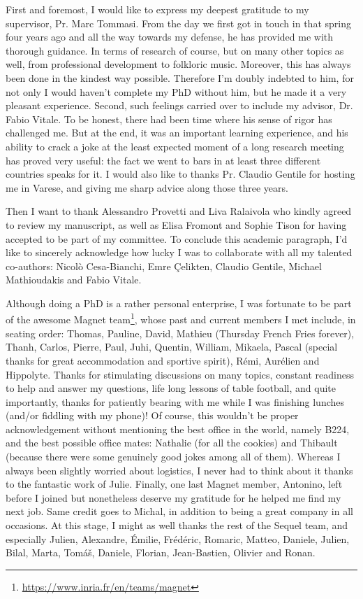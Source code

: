 First and foremost, I would like to express my deepest gratitude to my
supervisor, Pr. Marc Tommasi. From the day we first got in touch in that spring
four years ago and all the way towards my defense, he has provided me with
thorough guidance. In terms of research of course, but on many other topics as
well, from professional development to folkloric music. Moreover, this has
always been done in the kindest way possible. Therefore I'm doubly indebted to
him, for not only I would haven't complete my PhD without him, but he made it a
very pleasant experience. Second, such feelings carried over to include my
advisor, Dr. Fabio Vitale. To be honest, there had been time where his sense of
rigor has challenged me. But at the end, it was an important learning
experience, and his ability to crack a joke at the least expected moment of a
long research meeting has proved very useful: the fact we went to bars in at
least three different countries speaks for it. I would also like to thanks Pr.
Claudio Gentile for hosting me in Varese, and giving me sharp advice along
those three years.

Then I want to thank Alessandro Provetti and Liva Ralaivola who kindly agreed
to review my manuscript, as well as Elisa Fromont and Sophie Tison for having
accepted to be part of my committee.
%
To conclude this academic paragraph, I'd like to sincerely acknowledge how
lucky I was to collaborate with all my talented co-authors: Nicolò
Cesa-Bianchi, Emre Çelikten, Claudio Gentile, Michael Mathioudakis and Fabio
Vitale.

Although doing a PhD is a rather personal enterprise, I was fortunate to be
part of the awesome Magnet
team\footnote{\url{https://www.inria.fr/en/teams/magnet}}, whose past and
current members I met include, in seating order: Thomas, Pauline, David,
Mathieu (Thursday French Fries forever), Thanh, Carlos, Pierre, Paul, Juhi,
Quentin, William, Mikaela, Pascal (special thanks for great accommodation and
sportive spirit), Rémi, Aurélien and Hippolyte. Thanks for stimulating
discussions on many topics, constant readiness to help and answer my questions,
life long lessons of table football, and quite importantly, thanks for
patiently bearing with me while I was finishing lunches (and/or fiddling with
my phone)! Of course, this wouldn't be proper acknowledgement without
mentioning the best office in the world, namely B224, and the best possible
office mates: Nathalie (for all the cookies) and Thibault (because there were
some genuinely good jokes among all of them). Whereas I always been slightly
worried about logistics, I never had to think about it thanks to the fantastic
work of Julie. Finally, one last Magnet member, Antonino, left before I joined
but nonetheless deserve my gratitude for he helped me find my next job. Same
credit goes to Michal, in addition to being a great company in all occasions.
At this stage, I might as well thanks the rest of the Sequel team, and
especially Julien, Alexandre, Émilie, Frédéric, Romaric, Matteo, Daniele,
Julien, Bilal, Marta, Tomáš,
Daniele, Florian, Jean-Bastien, Olivier and Ronan.

